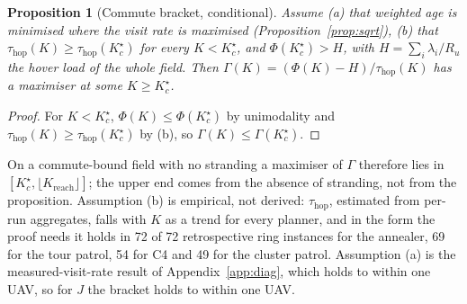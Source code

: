 \documentclass[journal,outdir=./]{IEEEtran}
\newtheorem{proposition}{Proposition}
\newcommand{\Kr}{K_{\mathrm{reach}}}
\newcommand{\Gam}{\Gamma}
\newcommand{\Ru}{R_u}
\begin{document}
\begin{proposition}[Commute bracket, conditional]\label{prop:bracket}
Assume (a) that weighted age is minimised where the visit rate is maximised (Proposition~\ref{prop:sqrt}), (b) that $\tau_{\mathrm{hop}}(K)\ge\tau_{\mathrm{hop}}(K_c^{\star})$ for every $K<K_c^{\star}$, and $\Phi(K_c^{\star})>H$, with $H=\sum_i\lambda_i/\Ru$ the hover load of the whole field. Then $\Gam(K)=(\Phi(K)-H)/\tau_{\mathrm{hop}}(K)$ has a maximiser at some $K\ge K_c^{\star}$.
\end{proposition}
\begin{proof}
For $K<K_c^{\star}$, $\Phi(K)\le\Phi(K_c^{\star})$ by unimodality and $\tau_{\mathrm{hop}}(K)\ge\tau_{\mathrm{hop}}(K_c^{\star})$ by (b), so $\Gam(K)\le\Gam(K_c^{\star})$.
\end{proof}
On a commute-bound field with no stranding a maximiser of $\Gam$ therefore lies in $[K_c^{\star},\lfloor\Kr\rfloor]$; the upper end comes from the absence of stranding, not from the proposition. Assumption (b) is empirical, not derived: $\tau_{\mathrm{hop}}$, estimated from per-run aggregates, falls with $K$ as a trend for every planner, and in the form the proof needs it holds in 72 of 72 retrospective ring instances for the annealer, 69 for the tour patrol, 54 for C4 and 49 for the cluster patrol. Assumption (a) is the measured-visit-rate result of Appendix~\ref{app:diag}, which holds to within one UAV, so for $J$ the bracket holds to within one UAV.
\end{document}
